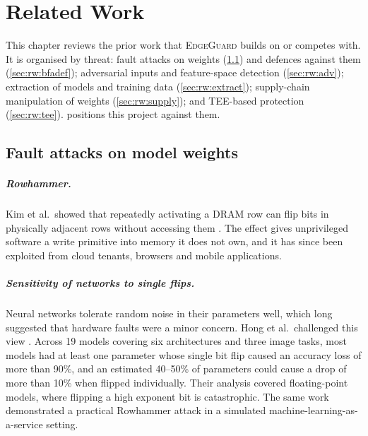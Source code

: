 \chapter{Related Work}
\label{ch:related}

This chapter reviews the prior work that \textsc{EdgeGuard} builds on or competes with. It is
organised by threat: fault attacks on weights (\cref{sec:rw:bfa}) and defences against them
(\cref{sec:rw:bfadef}); adversarial inputs and feature-space detection (\cref{sec:rw:adv});
extraction of models and training data (\cref{sec:rw:extract}); supply-chain manipulation of
weights (\cref{sec:rw:supply}); and TEE-based protection (\cref{sec:rw:tee}).
 positions this project against them.

\section{Fault attacks on model weights}
\label{sec:rw:bfa}

\paragraph{Rowhammer.} Kim et al.\ showed that repeatedly activating a DRAM row can flip bits
in physically adjacent rows without accessing them \cite{kim2014flipping}. The effect gives
unprivileged software a write primitive into memory it does not own, and it has since been
exploited from cloud tenants, browsers and mobile applications.

\paragraph{Sensitivity of networks to single flips.} Neural networks tolerate random noise in
their parameters well, which long suggested that hardware faults were a minor concern. Hong et
al.\ challenged this view \cite{hong2019terminal}. Across 19 models covering six architectures
and three image tasks, most models had at least one parameter whose single bit flip caused an
accuracy loss of more than 90\%, and an estimated 40--50\% of parameters could cause a drop of
more than 10\% when flipped individually. Their analysis covered floating-point models, where
flipping a high exponent bit is catastrophic. The same work demonstrated a practical Rowhammer
attack in a simulated machine-learning-as-a-service setting.

